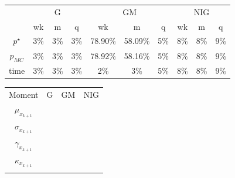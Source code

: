 \begin{table}[]
	\centering
	\begin{tabular}{@{}*{10}{c}@{}}
		\toprule
		& \multicolumn{3}{c}{G} & \multicolumn{3}{c}{GM} & \multicolumn{3}{c}{NIG} \\
		\addlinespace[0.5em]
		\cmidrule(l){2-4} \cmidrule(l){5-7} \cmidrule(l){8-10} 
		& wk & m & q 	& wk & m & q 	& wk & m & q\\
		\addlinespace[0.5em]
	$p^{\star}$ & 3\% & 3\% & 3\% & 78.90\%  & 58.09\% & 5\% & 8\% & 8\% &9\%  \\
	\addlinespace[0.5em]
	$p_{MC}$ & 3\% & 3\% & 3\% & 78.92\%  & 58.16\% & 5\% & 8\% & 8\% &9\%  \\
	\addlinespace[0.5em]	
	time & 3\% & 3\% & 3\% & 2\%  & 3\% & 5\% & 8\% & 8\% &9\%  \\	\bottomrule
	\end{tabular}
\end{table}

\begin{table}[]
	
	\centering
	\begin{tabular}{@{}*{4}{c}@{}}
		\toprule
	Moment	& G & GM & NIG \\
		\addlinespace[0.5em]
		\midrule	
	$\mu_{x_{k+1}}$	& & & \\
	\addlinespace[0.5em]	
	$\sigma_{x_{k+1}}$	& & & \\
	\addlinespace[0.5em]
	$\gamma_{x_{k+1}}$	& & & \\
	\addlinespace[0.5em]
	$\kappa_{x_{k+1}}$	& & & \\
	\addlinespace[0.5em]
	\bottomrule
	\end{tabular}
\end{table}
